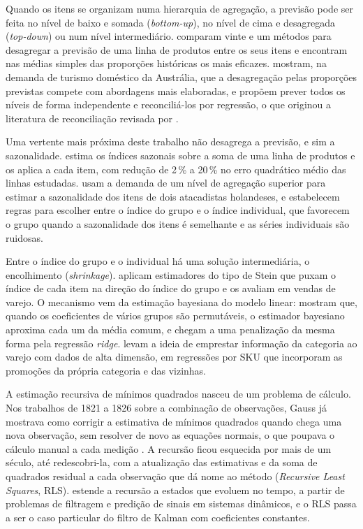 \documentclass[
    12pt,
    openright,
    oneside,
    a4paper,
    fleqn,
    chapter=TITLE,
    section=TITLE,
    english,
    brazil
]{abntex2}
\begin{document}
Quando os itens se organizam numa hierarquia de agregação, a previsão pode ser feita no nível de baixo e somada (\textit{bottom-up}), no nível de cima e desagregada (\textit{top-down}) ou num nível intermediário.  comparam vinte e um métodos para desagregar a previsão de uma linha de produtos entre os seus itens e encontram nas médias simples das proporções históricas os mais eficazes.  mostram, na demanda de turismo doméstico da Austrália, que a desagregação pelas proporções previstas compete com abordagens mais elaboradas, e  propõem prever todos os níveis de forma independente e reconciliá-los por regressão, o que originou a literatura de reconciliação revisada por .

Uma vertente mais próxima deste trabalho não desagrega a previsão, e sim a sazonalidade.  estima os índices sazonais sobre a soma de uma linha de produtos e os aplica a cada item, com redução de 2\,\% a 20\,\% no erro quadrático médio das linhas estudadas.  usam a demanda de um nível de agregação superior para estimar a sazonalidade dos itens de dois atacadistas holandeses, e  estabelecem regras para escolher entre o índice do grupo e o índice individual, que favorecem o grupo quando a sazonalidade dos itens é semelhante e as séries individuais são ruidosas.

Entre o índice do grupo e o individual há uma solução intermediária, o encolhimento (\textit{shrinkage}).  aplicam estimadores do tipo de Stein que puxam o índice de cada item na direção do índice do grupo e os avaliam em vendas de varejo. O mecanismo vem da estimação bayesiana do modelo linear:  mostram que, quando os coeficientes de vários grupos são permutáveis, o estimador bayesiano aproxima cada um da média comum, e  chegam a uma penalização da mesma forma pela regressão \textit{ridge}.  levam a ideia de emprestar informação da categoria ao varejo com dados de alta dimensão, em regressões por SKU que incorporam as promoções da própria categoria e das vizinhas.

A estimação recursiva de mínimos quadrados nasceu de um problema de cálculo. Nos trabalhos de 1821 a 1826 sobre a combinação de observações, Gauss já mostrava como corrigir a estimativa de mínimos quadrados quando chega uma nova observação, sem resolver de novo as equações normais, o que poupava o cálculo manual a cada medição \cite{young2011}. A recursão ficou esquecida por mais de um século, até  redescobri-la, com a atualização das estimativas e da soma de quadrados residual a cada observação que dá nome ao método (\textit{Recursive Least Squares}, RLS).  estende a recursão a estados que evoluem no tempo, a partir de problemas de filtragem e predição de sinais em sistemas dinâmicos, e o RLS passa a ser o caso particular do filtro de Kalman com coeficientes constantes.
\end{document}
